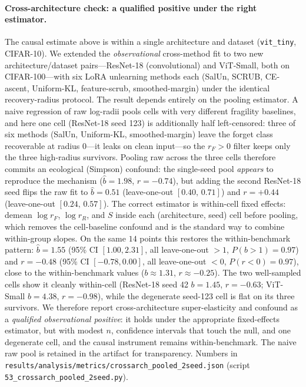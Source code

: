 \paragraph{Cross-architecture check: a qualified positive under the right
estimator.} The causal estimate above is within a single architecture and dataset
(\texttt{vit\_tiny}, CIFAR-10). We extended the \emph{observational} cross-method
fit to two new architecture/dataset pairs---ResNet-18 (convolutional) and
ViT-Small, both on CIFAR-100---with six LoRA unlearning methods each (SalUn,
SCRUB, CE-ascent, Uniform-KL, feature-scrub, smoothed-margin) under the identical
recovery-radius protocol. The result depends entirely on the pooling estimator. A
naive regression of raw log-radii pools cells with very different fragility
baselines, and here one cell (ResNet-18 seed 123) is additionally half
left-censored: three of six methods (SalUn, Uniform-KL, smoothed-margin) leave the
forget class recoverable at radius $0$---it leaks on clean input---so the
$r_F>0$ filter keeps only the three high-radius survivors. Pooling raw across the
three cells therefore commits an ecological (Simpson) confound: the single-seed
pool \emph{appears} to reproduce the mechanism ($\hat b=1.98$, $r=-0.74$), but
adding the second ResNet-18 seed flips the raw fit to $\hat b=0.51$
(leave-one-out $[0.40,\,0.71]$) and $r=+0.44$ (leave-one-out $[0.24,\,0.57]$). The
correct estimator is within-cell fixed effects: demean $\log r_F$, $\log r_R$, and
$S$ inside each (architecture, seed) cell before pooling, which removes the
cell-baseline confound and is the standard way to combine within-group slopes. On
the same $14$ points this restores the within-benchmark pattern: $\hat b=1.55$
(95\% CI $[1.00,2.31]$, all leave-one-out $>1$, $P(b{>}1)=0.97$) and $r=-0.48$
(95\% CI $[-0.78,0.00]$, all leave-one-out $<0$, $P(r{<}0)=0.97$), close to the
within-benchmark values ($b\approx1.31$, $r\approx-0.25$). The two well-sampled
cells show it cleanly within-cell (ResNet-18 seed 42 $b=1.45$, $r=-0.63$;
ViT-Small $b=4.38$, $r=-0.98$), while the degenerate seed-123 cell is flat on its
three survivors. We therefore report cross-architecture super-elasticity and
confound as a \emph{qualified observational positive}: it holds under the
appropriate fixed-effects estimator, but with modest $n$, confidence intervals
that touch the null, and one degenerate cell, and the causal instrument remains
within-benchmark. The naive raw pool is retained in the artifact for transparency.
Numbers in \texttt{results/analysis/metrics/crossarch\_pooled\_2seed.json} (script
\texttt{53\_crossarch\_pooled\_2seed.py}).

%
%
%
